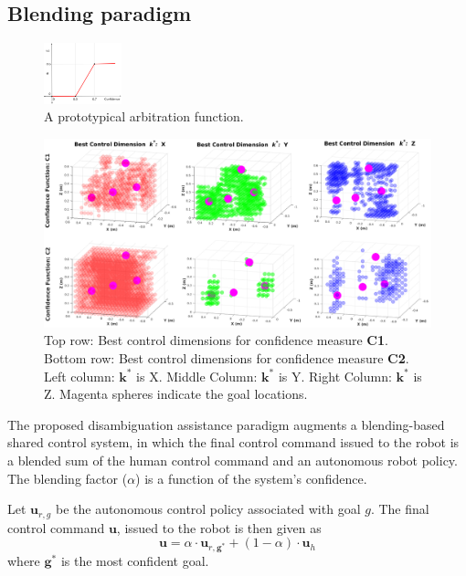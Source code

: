 \documentclass[conference]{IEEEtran}
\begin{document}
\subsection{Blending paradigm}\label{BP}
\begin{figure}
	\begin{center}
		\vspace{-0.9cm}
		\includegraphics[width=0.2\textwidth]{./figures/ArbFunc.png}
	\end{center}
		\vspace{-.45cm}
	\caption{A prototypical arbitration function.}
	\label{ALPHA}
\end{figure}
\begin{figure}[ht]
	\centering
	\includegraphics[width = 0.9\hsize, height = 0.35\vsize]{./figures/POINT_CLOUD.png}
	\caption{Top row: Best control dimensions for confidence measure \textbf{C1}. Bottom row: Best control dimensions for confidence measure \textbf{C2}. Left column: $\boldsymbol{k}^*$ is X. Middle Column: $\boldsymbol{k}^*$ is Y. Right Column: $\boldsymbol{k}^*$ is Z. Magenta spheres indicate the goal locations.}
	\label{HM_SEP}
\end{figure}
The proposed disambiguation assistance paradigm augments a blending-based shared control system, in which the final control command issued to the robot is a blended sum of the human control command and an autonomous robot policy. The blending factor ($\alpha$) is a function of the system's confidence.

Let $\boldsymbol{u}_{r,g}$ be the autonomous control policy associated with goal $g$. The final control command $\boldsymbol{u}$, issued to the robot is then given as 
\begin{equation*}
\boldsymbol{u} = \alpha\cdot \boldsymbol{u}_{r,\boldsymbol{g}^*} + (1 - \alpha)\cdot \boldsymbol{u}_h
\end{equation*}
where $\boldsymbol{g}^*$ is the most confident goal. 
\end{document}

